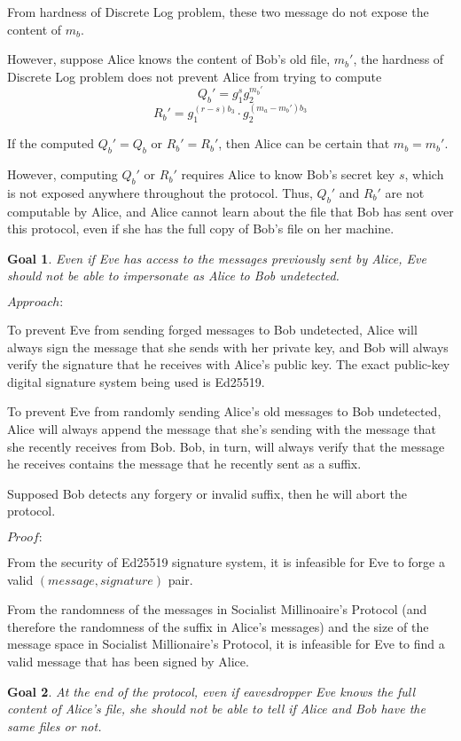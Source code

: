 \documentclass{article}
\newtheorem{goal}{Goal}
\begin{document}
From hardness of Discrete Log problem, these two message do not expose the content of 
$m_b$.

However, suppose Alice knows the content of Bob's old file, $m_b'$, the hardness of 
Discrete Log problem does not prevent Alice from trying 
to compute $$Q_b' = g_1^sg_2^{m_b'}$$
$$R_{b}' = g_1^{(r-s)b_3} \cdot g_2^{(m_a-m_b')b_3}$$ 

If the computed $Q_b' = Q_b$ or $R_b' = R_b'$, then Alice can be certain that $m_b = m_b'$.

However, computing $Q_b'$ or $R_b'$ requires Alice to know Bob's secret key $s$, which is 
not exposed anywhere throughout the protocol. Thus, $Q_b'$ and $R_b'$ are not 
computable by Alice, and Alice cannot learn about the file that Bob has sent over 
this protocol, even if she has the full copy of Bob's file on her machine.

\begin{goal}
Even if Eve has access to the messages previously sent by Alice, Eve should not
be able to impersonate as Alice to Bob undetected.
\end{goal}

$Approach:$

To prevent Eve from sending forged messages to Bob undetected, Alice will always sign the 
message that she sends with her private key, and Bob will always verify the signature that 
he receives with Alice's public key. The exact public-key digital signature system 
being used is Ed25519.

To prevent Eve from randomly sending Alice's old messages to Bob undetected, Alice will 
always append the message that she's sending with the message that she recently receives 
from Bob. Bob, in turn, will always verify that the message he receives contains 
the message that he recently sent as a suffix.

Supposed Bob detects any forgery or invalid suffix, then he will abort the protocol.

$Proof:$

From the security of Ed25519 signature system, it is infeasible for Eve to 
forge a valid $(message, signature)$ pair.

From the randomness of the messages in Socialist Millinoaire's Protocol (and therefore 
the randomness of the suffix in Alice's messages) and the size of the message space in 
Socialist Millionaire's Protocol, 
it is infeasible for Eve to find a valid message that has been signed by Alice.

\begin{goal}
At the end of the protocol, even if eavesdropper Eve knows the full content of Alice's file,
she should not be able to tell if Alice and Bob have the same files or not.
\end{goal}
\end{document}
